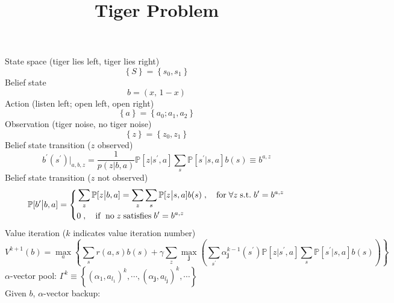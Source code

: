 \documentclass[a4paper,onecolumn]{article}
\begin{document}
\setcounter{page}{1}

\title{Tiger Problem}
\maketitle

\noindent State space (tiger lies left, tiger lies right)
\begin{equation}
    \left\{S\right\} = \left\{s_0, s_1\right\}
\end{equation}
Belief state
\begin{equation}
    b = (x, \, 1-x)
\end{equation}
Action (listen left; open left, open right)
\begin{equation}
    \left\{a\right\} = \left\{a_0; a_1, a_2\right\}
\end{equation}
Observation (tiger noise, no tiger noise)
\begin{equation}
    \left\{z\right\} = \left\{z_0, z_1\right\}
\end{equation}
Belief state transition ($z$ observed)
\begin{equation}
    b^\prime (s^\prime)\Big|_{a,b,z} = \frac{1}{p(z|b,a)} \mathbb{P}[z|s^\prime,a]
	\sum_s\mathbb{P}[s^\prime|s,a]b(s) \equiv b^{a,z}
\end{equation}
Belief state transition ($z$ not observed)
\begin{equation}
    \mathbb{P}[b^\prime\big|b,a] = \left\{
	\begin{split}
		&\sum_z \mathbb{P}[z\big|b,a] =
		\sum_z\sum_s\mathbb{P}[z\big|s,a]b(s)\;,
		\quad \textrm{for}\;\forall z \; \textrm{s.t.}\; b^\prime=b^{a,z} \\
		&0\;,\quad \textrm{if\; no}\; z\; \textrm{satisfies}\; b^\prime=b^{a,z}
	\end{split}
	\right.
\end{equation}
Value iteration ($k$ indicates value iteration number)
\begin{equation}
    V^{k+1}(b) = \max_{a}\left\{
	    \sum_s r(a,s) b(s) + \gamma \sum_z
		\max_{\textbf{j}}\left( \sum_{s^\prime} \alpha^{k-1}_\textbf{j}(s^\prime)
		\mathbb{P}\left[z\big| s^\prime, a\right]
		\sum_s\mathbb{P}\left[s^\prime\big|s,a\right]b(s)\right)
	\right\}
\end{equation}
$\alpha$-vector pool: $\Gamma^{k}\equiv
\left\{(\alpha_1,a_{l_1})^k,\cdots,(\alpha_\textbf{j},a_{l_\textbf{j}})^k,\cdots\right\}$\\
Given $b$, $\alpha$-vector backup:
\end{document}
